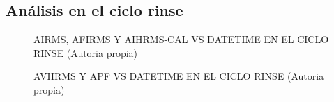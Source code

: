 \subsection{Análisis en el ciclo rinse}
\begin{figure}[H]
  \hfill
  \hfill
  \hfill
  \caption{AIRMS, AFIRMS Y AIHRMS-CAL VS DATETIME EN EL CICLO RINSE (Autoria propia)}
  \end{figure}
\begin{figure}[H]
  \hfill
  \hfill
  \hfill
  \caption{AVHRMS Y APF VS DATETIME EN EL CICLO RINSE (Autoria propia)}
  \end{figure}
